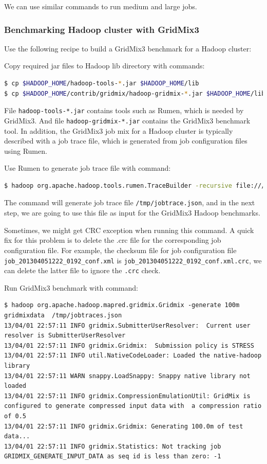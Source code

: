 We can use similar commands to run medium and large jobs.

\subsubsection*{Benchmarking Hadoop cluster with GridMix3}
Use the following recipe to build a GridMix3 benchmark for a Hadoop cluster:

Copy required jar files to Hadoop lib directory with commands:
\lstset{style=bashstyle}
\begin{lstlisting}[language=bash]
$ cp $HADOOP_HOME/hadoop-tools-*.jar $HADOOP_HOME/lib
$ cp $HADOOP_HOME/contrib/gridmix/hadoop-gridmix-*.jar $HADOOP_HOME/lib
\end{lstlisting}

File \verb|hadoop-tools-*.jar| contains tools such as Rumen, which is needed by GridMix3. And file \verb|hadoop-gridmix-*.jar| contains the GridMix3 benchmark tool. In addition, the GridMix3 job mix for a Hadoop cluster is typically described with a job trace file, which is generated from job configuration files using Rumen.

Use Rumen to generate job trace file with command:
\lstset{style=bashstyle}
\begin{lstlisting}[language=bash]
$ hadoop org.apache.hadoop.tools.rumen.TraceBuilder -recursive file:///tmp/jobtrace.json file:///tmp/topology.out file:///usr/local/hadoop/logs/history/done
\end{lstlisting}

The command will generate job trace file \verb|/tmp/jobtrace.json|, and in the next step, we are going to use this file as input for the GridMix3 Hadoop benchmarks.

Sometimes, we might get CRC exception when running this command. A quick fix for this problem is to delete the .crc file for the corresponding job configuration file.  For example, the checksum file for job configuration file \verb|job_201304051222_0192_conf.xml| is \verb|job_201304051222_0192_conf.xml.crc|, we can delete the latter file to ignore the \verb|.crc| check.

Run GridMix3 benchmark with command:
\lstset{style=bashstyle}
\begin{lstlisting}
$ hadoop org.apache.hadoop.mapred.gridmix.Gridmix -generate 100m gridmixdata  /tmp/jobtraces.json
13/04/01 22:57:11 INFO gridmix.SubmitterUserResolver:  Current user resolver is SubmitterUserResolver
13/04/01 22:57:11 INFO gridmix.Gridmix:  Submission policy is STRESS
13/04/01 22:57:11 INFO util.NativeCodeLoader: Loaded the native-hadoop library
13/04/01 22:57:11 WARN snappy.LoadSnappy: Snappy native library not loaded
13/04/01 22:57:11 INFO gridmix.CompressionEmulationUtil: GridMix is configured to generate compressed input data with  a compression ratio of 0.5
13/04/01 22:57:11 INFO gridmix.Gridmix: Generating 100.0m of test data...
13/04/01 22:57:11 INFO gridmix.Statistics: Not tracking job GRIDMIX_GENERATE_INPUT_DATA as seq id is less than zero: -1
\end{lstlisting}

